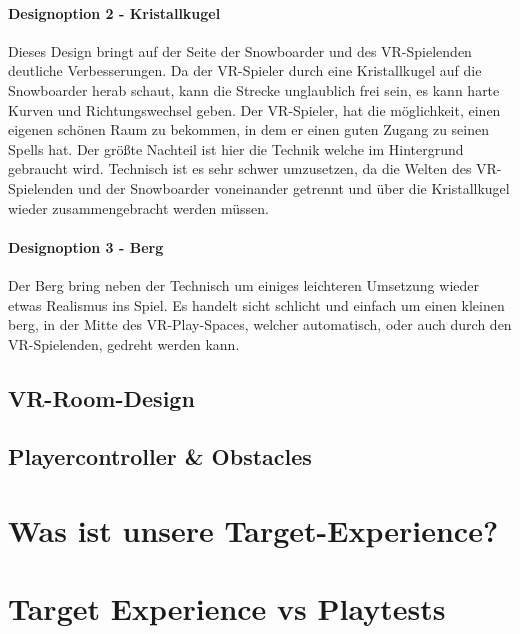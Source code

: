 \paragraph{Designoption 2 - Kristallkugel}

Dieses Design bringt auf der Seite der Snowboarder und des VR-Spielenden deutliche Verbesserungen. Da der VR-Spieler durch eine Kristallkugel auf die Snowboarder herab schaut, kann die Strecke unglaublich frei sein, es kann harte Kurven und Richtungswechsel geben. Der VR-Spieler, hat die möglichkeit, einen eigenen schönen Raum zu bekommen, in dem er einen guten Zugang zu seinen Spells hat. Der größte Nachteil ist hier die Technik welche im Hintergrund gebraucht wird. Technisch ist es sehr schwer umzusetzen, da die Welten des VR-Spielenden und der Snowboarder voneinander getrennt und über die Kristallkugel wieder zusammengebracht werden müssen.

\paragraph{Designoption 3 - Berg}

Der Berg bring neben der Technisch um einiges leichteren Umsetzung wieder etwas Realismus ins Spiel. Es handelt sicht schlicht und einfach um einen kleinen berg, in der Mitte des VR-Play-Spaces, welcher automatisch, oder auch durch den VR-Spielenden, gedreht werden kann.

\subsection{VR-Room-Design}

\subsection{Playercontroller \& Obstacles}

\section{Was ist unsere Target-Experience?}

\section{Target Experience vs Playtests}
